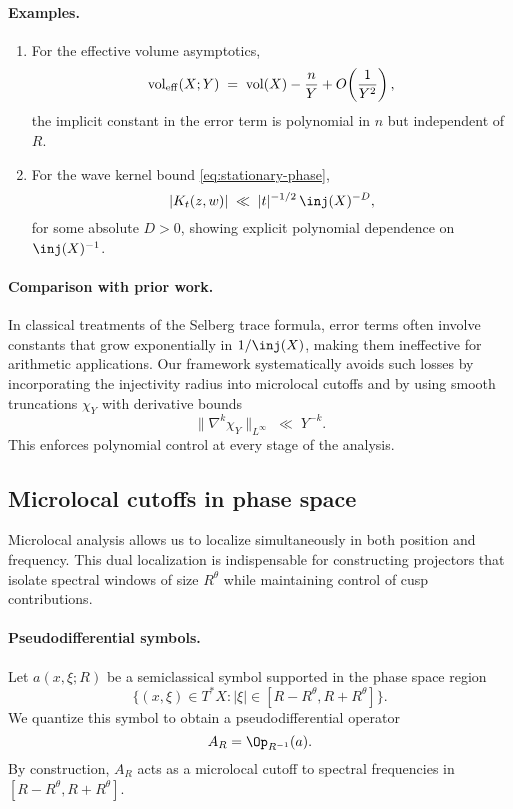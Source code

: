 \paragraph{Examples.}
\begin{enumerate}
  \item For the effective volume asymptotics,
  \[
    \operatorname{vol}_{\mathrm{eff}}(X;Y) \;=\; \operatorname{vol}(X) - \frac{n}{Y} + O\!\left(\frac{1}{Y^2}\right),
  \]
  the implicit constant in the error term is polynomial in $n$ but independent of $R$.
  \item For the wave kernel bound \eqref{eq:stationary-phase},  
  \[
    |K_t(z,w)| \;\ll\; |t|^{-1/2}\,\inj(X)^{-D},
  \]
  for some absolute $D>0$, showing explicit polynomial dependence on $\inj(X)^{-1}$.
\end{enumerate}

\paragraph{Comparison with prior work.}
In classical treatments of the Selberg trace formula, error terms often involve
constants that grow exponentially in $1/\inj(X)$, making them ineffective
for arithmetic applications.  
Our framework systematically avoids such losses by incorporating the injectivity radius 
into microlocal cutoffs and by using smooth truncations $\chi_Y$ with derivative bounds
\[
  \|\nabla^k \chi_Y\|_{L^\infty} \;\ll\; Y^{-k}.
\]
This enforces polynomial control at every stage of the analysis.

\subsection{Microlocal cutoffs in phase space}\label{subsec:cutoffs}

Microlocal analysis allows us to localize simultaneously in both position and frequency.  
This dual localization is indispensable for constructing projectors that isolate spectral windows 
of size $R^\theta$ while maintaining control of cusp contributions.

\paragraph{Pseudodifferential symbols.}
Let $a(x,\xi;R)$ be a semiclassical symbol supported in the phase space region
\[
  \{ (x,\xi) \in T^*X : |\xi| \in [R-R^\theta, R+R^\theta]\}.
\]
We quantize this symbol to obtain a pseudodifferential operator
\[
  A_R = \Op_{R^{-1}}(a).
\]
By construction, $A_R$ acts as a microlocal cutoff to spectral frequencies in $[R-R^\theta,R+R^\theta]$.


